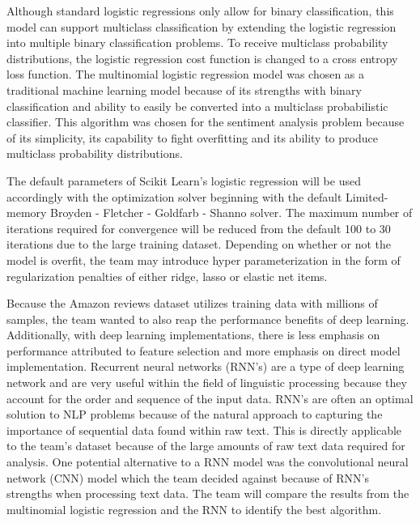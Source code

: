 \documentclass[conference]{IEEEtran}
\begin{document}
Although standard logistic regressions only allow for binary classification, this model can support multiclass classification by extending the logistic regression into multiple binary classification problems. To receive multiclass probability distributions, the logistic regression cost function is changed to a cross entropy loss function. The multinomial logistic regression model was chosen as a traditional machine learning model because of its strengths with binary classification and ability to easily be converted into a multiclass probabilistic classifier. This algorithm was chosen for the sentiment analysis problem because of its simplicity, its capability to fight overfitting and its ability to produce multiclass probability distributions. 

The default parameters of Scikit Learn’s logistic regression will be used accordingly with the optimization solver beginning with the default Limited-memory Broyden - Fletcher - Goldfarb - Shanno solver. The maximum number of iterations required for convergence will be reduced from the default 100 to 30 iterations due to the large training dataset. Depending on whether or not the model is overfit, the team may introduce hyper parameterization in the form of regularization penalties of either ridge, lasso or elastic net items. 

Because the Amazon reviews dataset utilizes training data with millions of samples, the team wanted to also reap the performance benefits of deep learning. Additionally, with deep learning implementations, there is less emphasis on performance attributed to feature selection and more emphasis on direct model implementation. Recurrent neural networks (RNN’s) are a type of deep learning network and are very useful within the field of linguistic processing because they account for the order and sequence of the input data. RNN’s are often an optimal solution to NLP problems because of the natural approach to capturing the importance of sequential data found within raw text. This is directly applicable to the team’s dataset because of the large amounts of raw text data required for analysis. One potential alternative to a RNN model was the convolutional neural network (CNN) model which the team decided against because of RNN’s strengths when processing text data. The team will compare the results from the multinomial logistic regression and the RNN to identify the best algorithm.  
\end{document}
